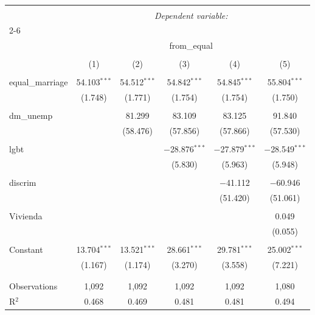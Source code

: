 \begin{table}[!htbp] \centering 
    \caption{} 
    \label{} 
  \begin{tabular}{@{\extracolsep{5pt}}lccccc} 
  \\[-1.8ex]\hline 
  \hline \\[-1.8ex] 
   & \multicolumn{5}{c}{\textit{Dependent variable:}} \\ 
  \cline{2-6} 
  \\[-1.8ex] & \multicolumn{5}{c}{from\_equal} \\ 
  \\[-1.8ex] & (1) & (2) & (3) & (4) & (5)\\ 
  \hline \\[-1.8ex] 
   equal\_marriage & 54.103$^{***}$ & 54.512$^{***}$ & 54.842$^{***}$ & 54.845$^{***}$ & 55.804$^{***}$ \\ 
    & (1.748) & (1.771) & (1.754) & (1.754) & (1.750) \\ 
    & & & & & \\ 
   dm\_unemp &  & 81.299 & 83.109 & 83.125 & 91.840 \\ 
    &  & (58.476) & (57.856) & (57.866) & (57.530) \\ 
    & & & & & \\ 
   lgbt &  &  & $-$28.876$^{***}$ & $-$27.879$^{***}$ & $-$28.549$^{***}$ \\ 
    &  &  & (5.830) & (5.963) & (5.948) \\ 
    & & & & & \\ 
   discrim &  &  &  & $-$41.112 & $-$60.946 \\ 
    &  &  &  & (51.420) & (51.061) \\ 
    & & & & & \\ 
   Vivienda &  &  &  &  & 0.049 \\ 
    &  &  &  &  & (0.055) \\ 
    & & & & & \\ 
   Constant & 13.704$^{***}$ & 13.521$^{***}$ & 28.661$^{***}$ & 29.781$^{***}$ & 25.002$^{***}$ \\ 
    & (1.167) & (1.174) & (3.270) & (3.558) & (7.221) \\ 
    & & & & & \\ 
  \hline \\[-1.8ex] 
  Observations & 1,092 & 1,092 & 1,092 & 1,092 & 1,080 \\ 
  R$^{2}$ & 0.468 & 0.469 & 0.481 & 0.481 & 0.494 \\ 

\end{tabular}
\end{table}

